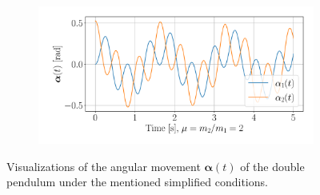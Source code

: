 \documentclass{report}
\numberwithin{tm}{section}
\newcommand\vect[1]{\ensuremath{\bm{#1}}}
\begin{document}
\begin{figure}[h]
\begin{subfigure}{0.49\textwidth}
	\end{subfigure} \hfill
	\begin{subfigure}{0.49\textwidth}
	\centering
	\includegraphics[width=\textwidth]{figures/angular_movement_dp2.pdf}
	\end{subfigure}
	\caption{Visualizations of the angular movement $\vect{\alpha}(t)$ of the double pendulum under the mentioned simplified conditions.}
	\label{fig:angular_movement}
\end{figure}
\end{document}
